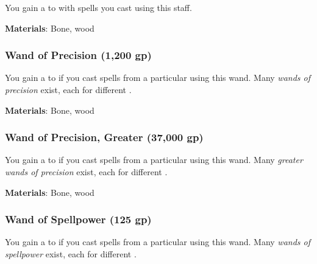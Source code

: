 You gain a   to  with spells you cast using this staff.



\vspace{0.25em}
\textbf{Materials}: Bone, wood


\lowercase{\hypertarget{item:Wand of Precision}{}}\label{item:Wand of Precision}
\hypertarget{item:Wand of Precision}{\subsubsection{Wand of Precision\hfill{} (1,200 gp)}}

You gain a   to  if you cast spells from a particular  using this wand.
Many \textit{wands of precision} exist, each for different .



\vspace{0.25em}
\textbf{Materials}: Bone, wood


\lowercase{\hypertarget{item:Wand of Precision, Greater}{}}\label{item:Wand of Precision, Greater}
\hypertarget{item:Wand of Precision, Greater}{\subsubsection{Wand of Precision, Greater\hfill{} (37,000 gp)}}

You gain a   to  if you cast spells from a particular  using this wand.
Many \textit{greater wands of precision} exist, each for different .



\vspace{0.25em}
\textbf{Materials}: Bone, wood


\lowercase{\hypertarget{item:Wand of Spellpower}{}}\label{item:Wand of Spellpower}
\hypertarget{item:Wand of Spellpower}{\subsubsection{Wand of Spellpower\hfill{} (125 gp)}}

You gain a   to  if you cast spells from a particular  using this wand.
Many \textit{wands of spellpower} exist, each for different .



